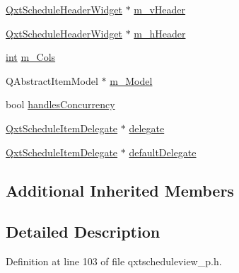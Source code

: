 \begin{DoxyCompactItemize}
\hyperlink{class_qxt_schedule_header_widget}{Qxt\-Schedule\-Header\-Widget} $\ast$ \hyperlink{class_qxt_schedule_view_private_a2e1b737cbe6365e0912c0eba21eb3d2e}{m\-\_\-v\-Header}
\item 
\hyperlink{class_qxt_schedule_header_widget}{Qxt\-Schedule\-Header\-Widget} $\ast$ \hyperlink{class_qxt_schedule_view_private_a07b5161e537aad14106e0adb296d9ae0}{m\-\_\-h\-Header}
\item 
\hyperlink{ioapi_8h_a787fa3cf048117ba7123753c1e74fcd6}{int} \hyperlink{class_qxt_schedule_view_private_abdc6a83bd72e6fe6bed43c56c4affe88}{m\-\_\-\-Cols}
\item 
Q\-Abstract\-Item\-Model $\ast$ \hyperlink{class_qxt_schedule_view_private_af64379945aa97466a6a01989b238625b}{m\-\_\-\-Model}
\item 
bool \hyperlink{class_qxt_schedule_view_private_ab8ffcb1e26c62bd1a090ce13f4438735}{handles\-Concurrency}
\item 
\hyperlink{qxtscheduleitemdelegate_8h_a9b8b6fec2a65bed5bb2b496d7178c6e0}{Qxt\-Schedule\-Item\-Delegate} $\ast$ \hyperlink{class_qxt_schedule_view_private_a98dc6cc67d2e8558e87b1b8048cb006e}{delegate}
\item 
\hyperlink{qxtscheduleitemdelegate_8h_a9b8b6fec2a65bed5bb2b496d7178c6e0}{Qxt\-Schedule\-Item\-Delegate} $\ast$ \hyperlink{class_qxt_schedule_view_private_a5d5b75a342263c6829d1564fc96886bc}{default\-Delegate}
\end{DoxyCompactItemize}
\subsection*{Additional Inherited Members}


\subsection{Detailed Description}


Definition at line 103 of file qxtscheduleview\-\_\-p.\-h.



